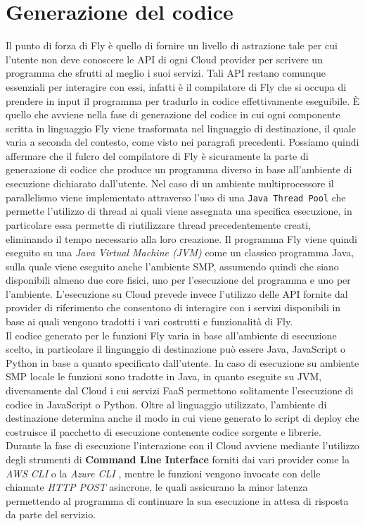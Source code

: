 \section{Generazione del codice}
Il punto di forza di Fly è quello di fornire un livello di astrazione tale per cui l'utente non deve conoscere le API di ogni Cloud provider per scrivere un programma che sfrutti al meglio i suoi servizi. Tali API restano comunque essenziali per interagire con essi, infatti è il compilatore di Fly che si occupa di prendere in input il programma per tradurlo in codice effettivamente eseguibile. È quello che avviene nella fase di generazione del codice in cui ogni componente scritta in linguaggio Fly viene trasformata nel linguaggio di destinazione, il quale varia a seconda del contesto, come visto nei paragrafi precedenti. Possiamo quindi affermare che il fulcro del compilatore di Fly è sicuramente la parte di generazione di codice che produce un programma diverso in base all’ambiente di esecuzione dichiarato dall’utente. Nel caso di un ambiente multiprocessore il parallelismo viene implementato attraverso l’uso di una \verb|Java Thread Pool| che permette l'utilizzo di thread ai quali viene assegnata una specifica esecuzione, in particolare essa permette di riutilizzare thread precedentemente creati, eliminando il tempo necessario alla loro creazione. Il programma Fly viene quindi eseguito su una \textit{Java Virtual Machine (JVM)} come un classico programma Java, sulla quale viene eseguito anche l’ambiente SMP, assumendo quindi che siano disponibili almeno due core fisici, uno per l’esecuzione del programma e uno per l’ambiente. L'esecuzione su Cloud prevede invece l'utilizzo delle API fornite dal provider di riferimento che consentono di interagire con i servizi disponibili in base ai quali vengono tradotti i vari costrutti e funzionalità di Fly.\\
Il codice generato per le funzioni Fly varia in base all'ambiente di esecuzione scelto, in particolare il linguaggio di destinazione può essere Java, JavaScript o Python in base a quanto specificato dall'utente. In caso di esecuzione su ambiente SMP locale le funzioni sono tradotte in Java, in quanto eseguite su JVM, diversamente dal Cloud i cui servizi FaaS permettono solitamente l'esecuzione di codice in JavaScript o Python. Oltre al linguaggio utilizzato, l’ambiente di destinazione determina anche il modo in cui viene generato lo script di deploy che costruisce il pacchetto di esecuzione contenente codice sorgente e librerie. \\
Durante la fase di esecuzione l'interazione con il Cloud avviene mediante l'utilizzo degli strumenti di \textbf{Command Line Interface} forniti dai vari provider come la \textit{AWS CLI} \cite{awsCLI} o la \textit{Azure CLI} \cite{azureCLI}, mentre le funzioni vengono invocate con delle chiamate \textit{HTTP POST} asincrone, le quali assicurano la minor latenza permettendo al programma di continuare la sua esecuzione in attesa di risposta da parte del servizio.

